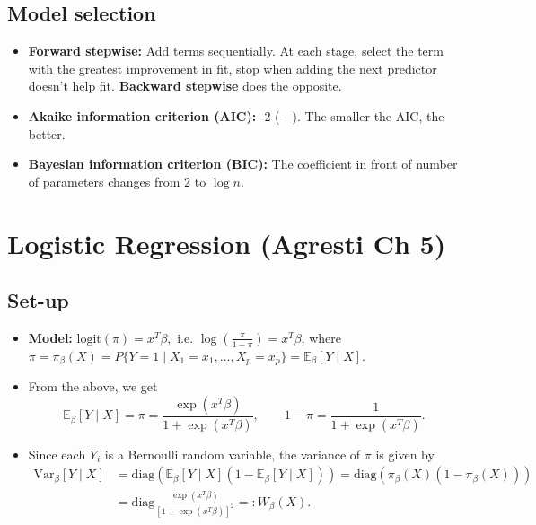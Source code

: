 \documentclass[twoside]{article}
\newcommand\bbE{\mathbb{E}}
\begin{document}
\subsection{Model selection}
\begin{itemize}
\item \textbf{Forward stepwise:} Add terms sequentially. At each stage, select the term with the greatest improvement in fit, stop when adding the next predictor doesn't help fit. \textbf{Backward stepwise} does the opposite.
\item \textbf{Akaike information criterion (AIC):} -2 ( - ). The smaller the AIC, the better.
\item \textbf{Bayesian information criterion (BIC):} The coefficient in front of number of parameters changes from $2$ to $\log n$.

\end{itemize}

\section{Logistic Regression (Agresti Ch 5)}
\subsection{Set-up}
\begin{itemize}
\item \textbf{Model:} $\text{logit}(\pi) = x^T \beta, \text{ i.e. } \log \left( \frac{\pi}{1 - \pi} \right) = x^T \beta$, where $\pi = \pi_\beta (X) = P \{Y = 1 \mid X_1 = x_1, \dots, X_p = x_p \} = \bbE_\beta [Y \mid X]$.

\item From the above, we get
\begin{equation*}
\bbE_\beta [Y \mid X] = \pi = \frac{\exp (x^T \beta)}{1 + \exp (x^T \beta)}, \qquad 1 - \pi = \frac{1}{1 + \exp (x^T \beta)}.
\end{equation*}

\item Since each $Y_i$ is a Bernoulli random variable, the variance of $\pi$ is given by
\begin{align*}
\text{Var}_\beta [Y \mid X] &= \text{diag}(\bbE_\beta [Y \mid X] (1 - \bbE_\beta [Y \mid X])) = \text{diag} (\pi_\beta (X) (1 - \pi_\beta(X))) \\
&= \text{diag} \frac{\exp (x^T \beta)}{[1 + \exp (x^T \beta)]^2} =: W_\beta(X).
\end{align*}

\end{itemize}
\end{document}
